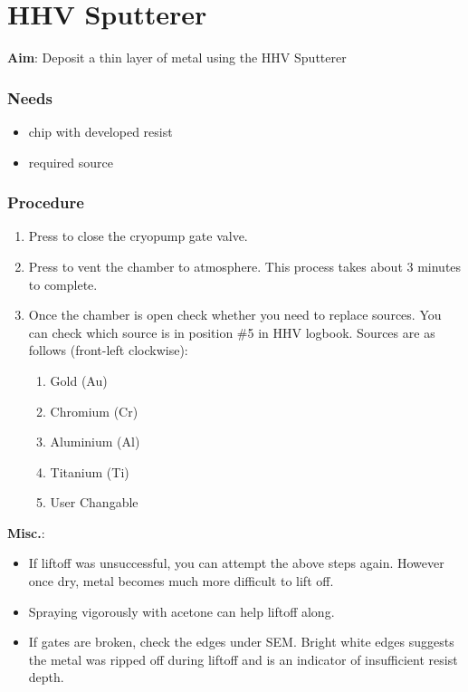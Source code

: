 \section{HHV Sputterer}

\textbf{Aim}:
Deposit a thin layer of metal using the HHV Sputterer

\subsubsection{Needs}
\begin{itemize}[noitemsep]
\item chip with developed resist
\item required source
\end{itemize}

\subsubsection{Procedure}
\begin{enumerate}
\item Press  to close the cryopump gate valve.
\item Press  to vent the chamber to atmosphere. This process takes about 3 minutes to complete.
\item Once the chamber is open check whether you need to replace sources. You can check which source is in position \#5 in HHV logbook. Sources are as follows (front-left clockwise):
\begin{enumerate}[label=Source~\#\arabic*:]
  \item Gold (Au)
  \item Chromium (Cr)
  \item Aluminium (Al)
  \item Titanium (Ti)
  \item User Changable
\end{enumerate}
\end{enumerate}

\noindent \textbf{Misc.}:
\begin{itemize}
\item If liftoff was unsuccessful, you can attempt the above steps again. However once dry, metal becomes
much more difficult to lift off.
\item Spraying vigorously with acetone can help liftoff along.
\item If gates are broken, check the edges under SEM. Bright white edges suggests the metal was ripped
off during liftoff and is an indicator of insufficient resist depth.
\end{itemize}
\newpage

